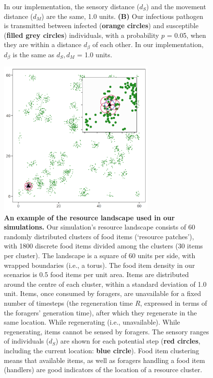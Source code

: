 \begin{figure}[!h]
{        In our implementation, the sensory distance (\(d_S\)) and the movement distance (\(d_M\)) are the same, 1.0 units. 
        \textbf{(B)} Our infectious pathogen is transmitted between infected (\textbf{orange circles}) and susceptible (\textbf{filled grey circles}) individuals, with a probability \(p\) = 0.05, when they are within a distance \(d_\beta\) of each other. 
        In our implementation, \(d_\beta\) is the same as \(d_S, d_M\) = 1.0 units.
    }\label{fig:patho_schematic}
\end{figure}

\begin{figure}
    \centering
    \includegraphics[width=0.7\textwidth]{figures/pathomove/fig_landscape.png}
    \caption{
        \textbf{An example of the resource landscape used in our simulations.} 
        Our simulation's resource landscape consists of 60 randomly distributed clusters of food items (`resource patches'), with 1800 discrete food items divided among the clusters (30 items per cluster). 
        The landscape is a square of 60 units per side, with wrapped boundaries (i.e., a torus). 
        The food item density in our scenarios is 0.5 food items per unit area. 
        Items are distributed around the centre of each cluster, within a standard deviation of 1.0 unit. 
        Items, once consumed by foragers, are unavailable for a fixed number of timesteps (the regeneration time $R$, expressed in terms of the foragers' generation time), after which they regenerate in the same location. 
        While regenerating (i.e., unavailable). While regenerating, items cannot be sensed by foragers. 
        The sensory ranges of individuals (\(d_S\)) are shown for each potential step (\textbf{red circles}, including the current location: \textbf{blue circle}). 
        Food item clustering means that available items, as well as foragers handling a food item (handlers) are good indicators of the location of a resource cluster.
    }\label{fig:patho_landscape}
\end{figure}

